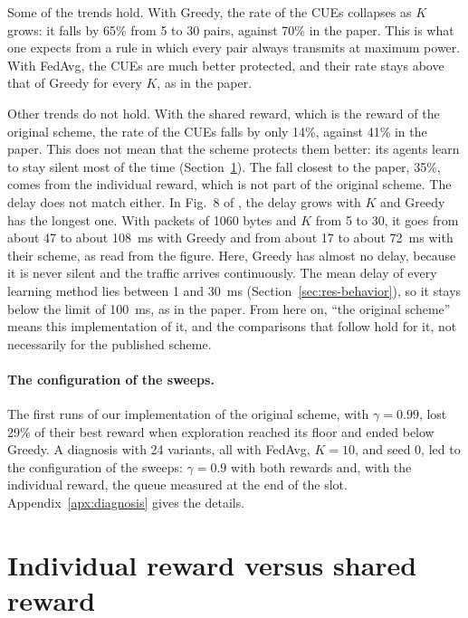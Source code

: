 Some of the trends hold. With Greedy, the rate of the \acp{CUE} collapses as $K$ grows: it falls by 65\% from
5 to 30 pairs, against 70\% in the paper. This is what one expects from a rule in which every pair always
transmits at maximum power. With \ac{FedAvg}, the \acp{CUE} are much better protected, and their rate stays
above that of Greedy for every $K$, as in the paper.

Other trends do not hold. With the shared reward, which is the reward of the original scheme, the rate of the
\acp{CUE} falls by only 14\%, against 41\% in the paper. This does not mean that the scheme protects them
better: its agents learn to stay silent most of the time (Section~\ref{sec:res-reward}). The fall closest to
the paper, 35\%, comes from the individual reward, which is not part of the original scheme. The delay does
not match either. In Fig.~8 of \citet{li+22fedmarl}, the delay grows with $K$ and Greedy has the longest one.
With packets of 1060 bytes and $K$ from 5 to 30, it goes from about 47 to about \SI{108}{\milli\second} with
Greedy and from about 17 to about \SI{72}{\milli\second} with their scheme, as read from the figure. Here,
Greedy has almost no delay, because it is never silent and the traffic arrives continuously. The mean delay of
every learning method lies between 1 and \SI{30}{\milli\second} (Section~\ref{sec:res-behavior}), so it stays
below the limit of \SI{100}{\milli\second}, as in the paper. From here on, ``the original scheme'' means this
implementation of it, and the comparisons that follow hold for it, not necessarily for the published scheme.

\paragraph{The configuration of the sweeps.} The first runs of our implementation of the original scheme, with
$\gamma = 0.99$, lost 29\% of their best reward when exploration reached its floor and ended below Greedy. A
diagnosis with 24 variants, all with \ac{FedAvg}, $K = 10$, and seed 0, led to the configuration of the
sweeps: $\gamma = 0.9$ with both rewards and, with the individual reward, the queue measured at the end of the
slot. Appendix~\ref{apx:diagnosis} gives the details.

\section{Individual reward versus shared reward}
\label{sec:res-reward}

